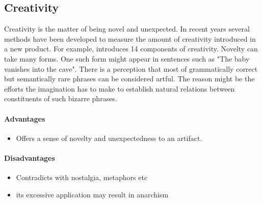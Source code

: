 \documentclass{article}
\begin{document}
			\subsection{Creativity}
				Creativity is the matter of being novel and unexpected. In recent years several methods have been developed to measure the amount of creativity introduced in a new product. For example, \citet{jordanous-2012-a-standardised-procedure-for-evaluating-creative-systems-computational-creativity-evaluation-based-on-what-it-is-to-be-creative} introduces 14 components of creativity. Novelty can take many forms. One such form might appear in sentences such as "The baby vanishes into the cave". There is a perception that most of grammatically correct but semantically rare phrases can be considered artful. The reason might be the efforts the imagination has to make to establish natural relations between constituents of such bizarre phrases.
				\paragraph{Advantages}
					\begin{itemize}
						\item Offers a sense of novelty and unexpectedness to an artifact.  
					\end{itemize}
				\paragraph{Disadvantages}
					\begin{itemize}
						\item Contradicts with nostalgia, metaphors etc
						\item its excessive application may result in anarchism 
					\end{itemize}
	
	
	
\end{document}
